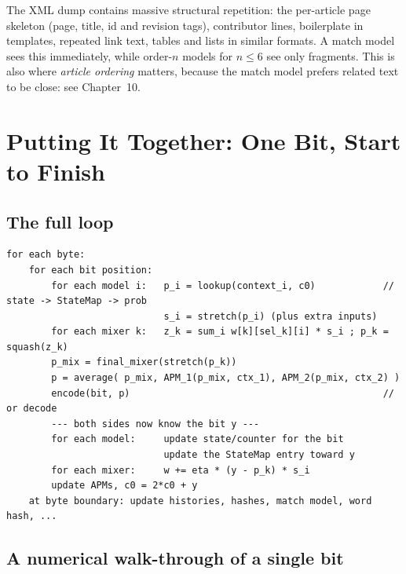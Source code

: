 \documentclass[11pt,a4paper,openany]{book}
\theoremstyle{definition}
\theoremstyle{remark}
\begin{document}
The XML dump contains massive structural repetition: the per-article page skeleton (page, title, id and revision tags), contributor lines, boilerplate in templates, repeated link text, tables and lists in similar formats. A match model sees this immediately, while order-$n$ models for $n\le6$ see only fragments. This is also where \emph{article ordering} matters, because the match model prefers related text to be close: see Chapter~10.

\chapter{Putting It Together: One Bit, Start to Finish}

\section{The full loop}

\begin{lstlisting}[style=pseudo]
for each byte:
    for each bit position:
        for each model i:   p_i = lookup(context_i, c0)            // state -> StateMap -> prob
                            s_i = stretch(p_i) (plus extra inputs)
        for each mixer k:   z_k = sum_i w[k][sel_k][i] * s_i ; p_k = squash(z_k)
        p_mix = final_mixer(stretch(p_k))
        p = average( p_mix, APM_1(p_mix, ctx_1), APM_2(p_mix, ctx_2) )
        encode(bit, p)                                             // or decode
        --- both sides now know the bit y ---
        for each model:     update state/counter for the bit
                            update the StateMap entry toward y
        for each mixer:     w += eta * (y - p_k) * s_i
        update APMs, c0 = 2*c0 + y
    at byte boundary: update histories, hashes, match model, word hash, ...
\end{lstlisting}

\section{A numerical walk-through of a single bit}
\end{document}
